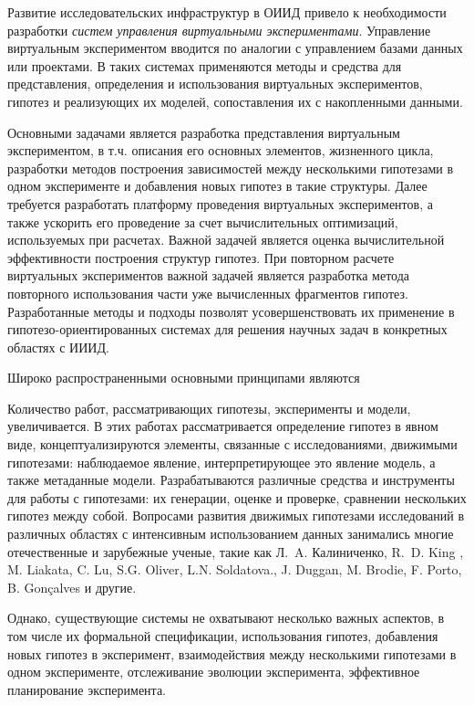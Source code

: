 Развитие исследовательских инфраструктур в ОИИД привело к необходимости разработки 
\textit{систем управления виртуальными экспериментами}. Управление виртуальным экспериментом вводится по 
аналогии с управлением базами данных или проектами. В таких системах применяются методы и средства  
для представления, определения и использования виртуальных экспериментов, гипотез и реализующих их моделей, 
сопоставления их с накопленными данными.

Основными задачами является разработка представления виртуальным экспериментом, в т.ч. описания его основных 
элементов, жизненного цикла, разработки методов построения зависимостей между несколькими гипотезами в одном 
эксперименте и добавления новых гипотез в такие структуры. Далее требуется разработать платформу 
проведения виртуальных экспериментов, а также ускорить его проведение за счет вычислительных оптимизаций, 
используемых при расчетах. Важной задачей является оценка вычислительной эффективности построения структур гипотез. 
При повторном расчете виртуальных экспериментов важной задачей является разработка 
метода повторного использования части уже вычисленных фрагментов гипотез. 
Разработанные методы и подходы позволят 
усовершенствовать их применение в гипотезо-ориентированных системах для решения научных задач 
в конкретных областях с ИИИД.


Широко распространенными основными принципами являются 

Количество работ, рассматривающих гипотезы, эксперименты и модели, увеличивается. В этих работах 
рассматривается определение гипотез в явном виде, концептуализируются элементы, связанные с исследованиями, 
движимыми гипотезами: наблюдаемое явление, интерпретирующее это явление модель, а также метаданные модели. 
Разрабатываются различные средства и инструменты для работы с гипотезами: их генерации, оценке и проверке, 
сравнении нескольких гипотез между собой. Вопросами развития движимых гипотезами исследований в различных 
областях с интенсивным использованием данных занимались многие отечественные и зарубежные ученые, такие 
как Л.~A. Калиниченко, R.~D. King , M. Liakata, C. Lu, S.G. Oliver, L.N. Soldatova., J. Duggan, M. Brodie, 
F. Porto, B. Gonçalves и другие. 



Однако, существующие системы не охватывают несколько важных аспектов, в том числе их формальной спецификации, 
использования гипотез, добавления новых гипотез в эксперимент, взаимодействия между несколькими гипотезами в 
одном эксперименте, отслеживание эволюции эксперимента, эффективное планирование эксперимента. 

